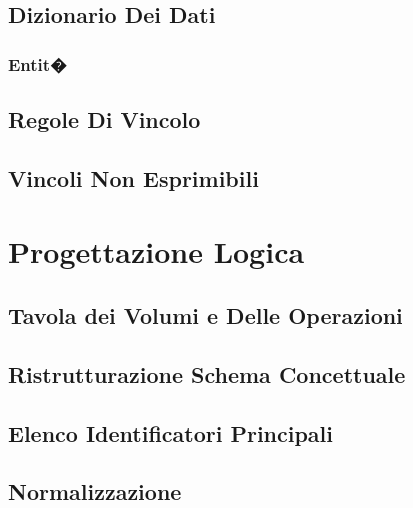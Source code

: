 \documentclass[12pt]{article} %
\begin{document}
		\subsection{Dizionario Dei Dati}

			\subsubsection{Entit�}

				
		\subsection{Regole Di Vincolo}

		
		\subsection{Vincoli Non Esprimibili}

		


	\section{Progettazione Logica}

		\subsection{Tavola dei Volumi e Delle Operazioni}

		
		\subsection{Ristrutturazione Schema Concettuale}

		
		\subsection{Elenco Identificatori Principali}

		
		\subsection{Normalizzazione}
\end{document}
